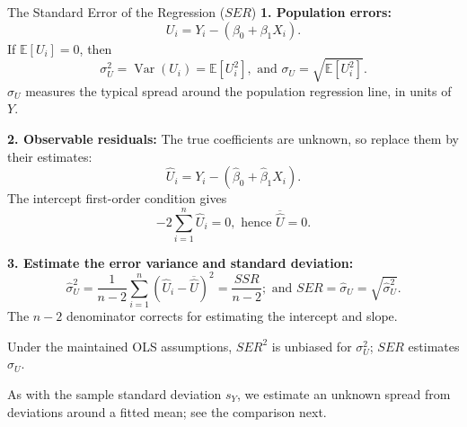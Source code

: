 \documentclass[notes,10pt, aspectratio=169]{beamer}
\begin{document}
\begin{frame}{The Standard Error of the Regression ($SER$)}
\footnotesize
\setlength{\abovedisplayskip}{3pt}
\setlength{\belowdisplayskip}{3pt}
\setlength{\abovedisplayshortskip}{2pt}
\setlength{\belowdisplayshortskip}{2pt}
\textbf{1. Population errors:}
\[
    U_i=Y_i-(\beta_0+\beta_1X_i).
\]
If $\mathbb{E}[U_i]=0$, then
\[
    \sigma_U^2=\operatorname{Var}(U_i)=\mathbb{E}[U_i^2],\text{ and }
    \sigma_U=\sqrt{\mathbb{E}[U_i^2]}.
\]
$\sigma_U$ measures the typical spread around the population regression line, in units of $Y$.
\par\medskip
\textbf{2. Observable residuals:} The true coefficients are unknown, so replace them by their estimates:
\[
    \hat{U}_i=Y_i-(\hat{\beta}_0+\hat{\beta}_1X_i).
\]
The intercept first-order condition gives
\[
    -2\sum_{i=1}^n\hat{U}_i=0,\text{ hence }\overline{\hat{U}}=0.
\]
\par\medskip
\textbf{3. Estimate the error variance and standard deviation:}
\[
    \hat{\sigma}_U^2=\frac{1}{n-2}\sum_{i=1}^n(\hat{U}_i-\overline{\hat{U}})^2
    =\frac{SSR}{n-2};
    \text{ and }SER=\hat{\sigma}_U=\sqrt{\hat{\sigma}_U^2}.
\]
The $n-2$ denominator corrects for estimating the intercept and slope.
\par\medskip
Under the maintained OLS assumptions, $SER^2$ is unbiased for $\sigma_U^2$; $SER$ estimates $\sigma_U$.
\par\smallskip
As with the sample standard deviation $s_Y$, we estimate an unknown spread from deviations around a fitted mean; see the comparison next.
\end{frame}
\end{document}
